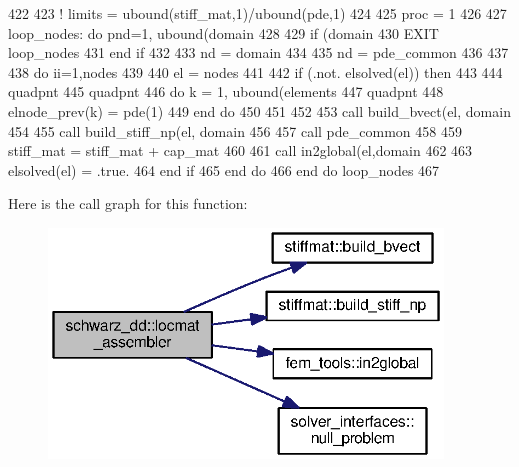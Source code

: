 \begin{DoxyCode}
422       
423 \textcolor{comment}{!       limits = ubound(stiff\_mat,1)/ubound(pde,1)}
424       
425       proc = 1
426 
427       loop\_nodes: \textcolor{keywordflow}{do} pnd=1, ubound(domain%
428 
429                       \textcolor{keywordflow}{if} (domain%
430                         \textcolor{keywordflow}{EXIT} loop\_nodes
431 \textcolor{keywordflow}{                      end if}
432 
433                       nd = domain%
434 
435                       nd = pde_common%
436 
437 
438                       \textcolor{keywordflow}{do} ii=1,nodes%
439 
440                         el = nodes%
441 
442                         \textcolor{keywordflow}{if} (.not. elsolved(el)) \textcolor{keywordflow}{then}
443 
444                           quadpnt%
445                           quadpnt%
446                           \textcolor{keywordflow}{do} k = 1, ubound(elements%
447                             quadpnt%
448                             elnode_prev(k) = pde(1)%
449 \textcolor{keywordflow}{                          end do}  
450 
451                           
452                           
453                           \textcolor{keyword}{call }build_bvect(el, domain%
454 
455                           \textcolor{keyword}{call }build_stiff_np(el, domain%
456 
457                           \textcolor{keyword}{call }pde_common%
458 
459                           stiff_mat = stiff_mat + cap_mat
460 
461                           \textcolor{keyword}{call }in2global(el,domain%
462 \textcolor{comment}{                          }
463 \textcolor{comment}{                          elsolved(el) = .true.}
464 \textcolor{comment}{}\textcolor{keywordflow}{                        end if}
465 \textcolor{keywordflow}{                      end do}
466 \textcolor{keywordflow}{      end do} loop\_nodes
467 
\end{DoxyCode}


Here is the call graph for this function\+:\nopagebreak
\begin{figure}[H]
\begin{center}
\leavevmode
\includegraphics[width=297pt]{namespaceschwarz__dd_a153ede1ee63fff0d346fe7699b46f76a_cgraph}
\end{center}
\end{figure}




